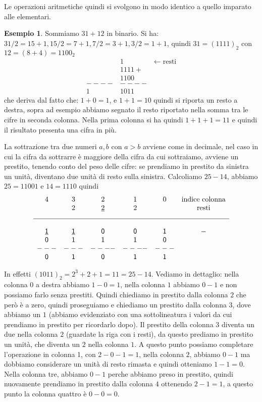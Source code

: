 \documentclass[a4paper]{book}
\theoremstyle{definition}
\newtheorem{ex}{Esempio}
\newcommand{\nota}[1]{\marginpar[{\raggedleft\small\sffamily #1\\}]{%
 								 {\raggedright\small\sffamily #1\\}}}
\begin{document}
Le operazioni aritmetiche quindi si svolgono in modo identico a quello imparato
alle elementari.\nota{Somme in binario}

\begin{ex}\label{ex:somma} Sommiamo $31+12$ in binario. Si ha: $31/2 = 15 + 1, 15/2 = 7 + 1, 7/2 = 3 + 1, 3 /2 = 1 + 1$, quindi $31 = (1111)_2$ con $12 = (8+4) = 1100_2$
\begin{align*}
    &1\qquad \qquad \leftarrow\text{resti}\\
	&1111+\\
	&1100\\
----&----\\
   1&1011   
\end{align*}
che deriva dal fatto che: $1+0 = 1$, e $1+1 = 10$ quindi si riporta un resto
a destra, sopra ad esempio abbiamo segnato il resto riportato nella somma tra le cifre in seconda colonna. Nella prima colonna si ha quindi $1+1+1 = 11$ e quindi il risultato presenta una cifra in più. 

La sottrazione tra due numeri $a,b$ con $a>b$ avviene come in decimale, nel caso in cui la cifra da sottrarre è maggiore della cifra da cui sottraiamo, avviene un prestito, tenendo conto del peso delle cifre: se prendiamo in prestito da sinistra un unità, diventano due unità di resto sulla sinistra.
Calcoliamo $25-14$, abbiamo $25 = 11001$ e $14 = 1110$ quindi
\[
\begin{matrix}
 4 & 3 &   2   & 1 & 0 & \text{indice colonna}\\
   & 2  & \underline{2} & 2 &   & \text{resti}\\[2ex]
\hline\\
 \underline{\mathsf 1} & \underline{\mathsf 1} & \mathsf 0  & \mathsf 0 & \mathsf 1 & \mathsf-\\
 \mathsf 0 & \mathsf 1 & \mathsf 1  & \mathsf 1 & \mathsf 0 & \\
---&---&----&----&---& \\
 \mathsf 0 & \mathsf 1 & \mathsf 0 & \mathsf 1 & \mathsf 1 &
\end{matrix}
\]

In effetti $(1011)_2 = 2^3+2+1 = 11 = 25-14$.
Vediamo in dettaglio: nella colonna $0$ a destra abbiamo $1-0 = 1$,
nella colonna $1$ abbiamo $0-1$ e non possiamo farlo senza prestiti. 
Quindi chiediamo in prestito dalla colonna $2$ che però è a zero, quindi proseguiamo e chiediamo un prestito dalla colonna $3$, dove abbiamo un $1$ (abbiamo evidenziato con una sottolineatura i valori da cui prendiamo in prestito per ricordarlo dopo).
Il prestito della colonna $3$ diventa un due nella colonna $2$ (guardate la riga con i resti), da questo prediamo in prestito un unità, che diventa un $2$ nella colonna $1$.
A questo punto possiamo completare l'operazione in colonna 1, con $2-0-1 = 1$,
nella colonna $2$, abbiamo $0 - 1$ ma dobbiamo considerare un unità di resto rimasta e quindi otteniamo $1 - 1 = 0$. Nella colonna tre, abbiamo $0-1$ perche abbiamo preso in prestito, quindi nuovamente prendiamo in prestito dalla colonna $4$ ottenendo $2-1 = 1$, a questo punto la colonna quattro è $0-0=0$.


\end{ex}
\end{document}
